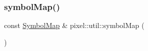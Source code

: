 \mbox{\label{namespacepixel_1_1util_a976cdfe804320f21bc1dd56c6cf95f60}} 
\subsubsection{\texorpdfstring{symbol\+Map()}{symbolMap()}}
{\footnotesize\ttfamily const \hyperlink{namespacepixel_1_1util_a7e4aecf0b9c892f3b2726c5a5cf00b02}{Symbol\+Map} \& pixel\+::util\+::symbol\+Map (\begin{DoxyParamCaption}{ }\end{DoxyParamCaption})}

